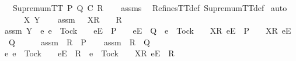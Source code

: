 \begin{isabellebody}
\ \ \ {\isachardoublequoteopen}SupremumTT\ P\ Q\ {\isasymsqsubseteq}\isactrlsub C\ R{\isachardoublequoteclose}\isanewline
%
\isadelimproof
\ \ %
\endisadelimproof
%
\isatagproof
{}\isamarkupfalse%
\ assms\ \isamarkupfalse%
\ RefinesTT{\isacharunderscore}def\ SupremumTT{\isacharunderscore}def\isanewline
{}\isamarkupfalse%
\ auto\isanewline
\ \ \isamarkupfalse%
\ {\isasymrho}\ {\isasymsigma}\ X\ Y\isanewline
\ \ \isamarkupfalse%
\ assm{}{\isacharcolon}\ {\isachardoublequoteopen}{\isasymrho}\ {\isacharat}\ {\isacharbrackleft}X{\isacharbrackright}\isactrlsub R\ {\isacharhash}\ {\isasymsigma}\ {\isasymin}\ R{\isachardoublequoteclose}\isanewline
\ \ \isamarkupfalse%
\ assm{}{\isacharcolon}\ {\isachardoublequoteopen}Y\ {\isasyminter}\ {\isacharbraceleft}e{\isachardot}\ e\ {\isasymnoteq}\ Tock\ {\isasymand}\ {\isasymrho}\ {\isacharat}\ {\isacharbrackleft}{\isacharbrackleft}e{\isacharbrackright}\isactrlsub E{\isacharbrackright}\ {\isasymin}\ P\ {\isasymand}\ {\isasymrho}\ {\isacharat}\ {\isacharbrackleft}{\isacharbrackleft}e{\isacharbrackright}\isactrlsub E{\isacharbrackright}\ {\isasymin}\ Q\ {\isasymor}\ e\ {\isacharequal}\ Tock\ {\isasymand}\ {\isasymrho}\ {\isacharat}\ {\isacharbrackleft}{\isacharbrackleft}X{\isacharbrackright}\isactrlsub R{\isacharcomma}\ {\isacharbrackleft}e{\isacharbrackright}\isactrlsub E{\isacharbrackright}\ {\isasymin}\ P\ {\isasymand}\ {\isasymrho}\ {\isacharat}\ {\isacharbrackleft}{\isacharbrackleft}X{\isacharbrackright}\isactrlsub R{\isacharcomma}\ {\isacharbrackleft}e{\isacharbrackright}\isactrlsub E{\isacharbrackright}\ {\isasymin}\ Q{\isacharbraceright}\ {\isacharequal}\ {\isacharbraceleft}{\isacharbraceright}{\isachardoublequoteclose}\isanewline
\ \ \isamarkupfalse%
\ assm{}{\isacharcolon}\ {\isachardoublequoteopen}\ R\ {\isasymsubseteq}\ P{\isachardoublequoteclose}\isanewline
\ \ \isamarkupfalse%
\ assm{}{\isacharcolon}\ {\isachardoublequoteopen}\ R\ {\isasymsubseteq}\ Q{\isachardoublequoteclose}\isanewline
\ \ \isamarkupfalse%
\ {\isachardoublequoteopen}{\isacharbraceleft}e{\isachardot}\ e\ {\isasymnoteq}\ Tock\ {\isasymand}\ {\isasymrho}\ {\isacharat}\ {\isacharbrackleft}{\isacharbrackleft}e{\isacharbrackright}\isactrlsub E{\isacharbrackright}\ {\isasymin}\ R\ {\isasymor}\ e\ {\isacharequal}\ Tock\ {\isasymand}\ {\isasymrho}\ {\isacharat}\ {\isacharbrackleft}{\isacharbrackleft}X{\isacharbrackright}\isactrlsub R{\isacharcomma}\ {\isacharbrackleft}e{\isacharbrackright}\isactrlsub E{\isacharbrackright}\ {\isasymin}\ R{\isacharbraceright}\isanewline

\end{isabellebody}
